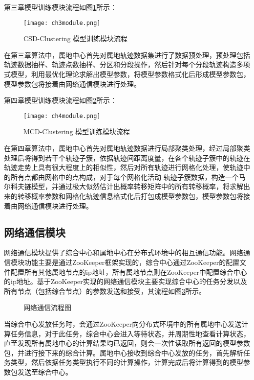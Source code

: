 第三章模型训练模块流程如图\ref{ch3module}所示：
\begin{figure}[h]
	\texttt{[image: ch3module.png]}
	\caption{CSD-Clustering 模型训练模块流程}
	\label{ch3module}
\end{figure}

在第三章算法中，属地中心首先对属地轨迹数据集进行了数据预处理，预处理包括轨迹数据抽样、轨迹点数抽样、分区和分段操作，然后针对每个分段轨迹构造多项式模型，利用最优化理论求解出模型参数，将模型参数格式化后形成模型参数包，模型参数包将接着由网络通信模块进行处理。

第四章模型训练模块流程如图\ref{ch4module}所示：
\begin{figure}[h]
	\texttt{[image: ch4module.png]}
	\caption{MCD-Clustering 模型训练模块流程}
	\label{ch4module}
\end{figure}

在第四章算法中，属地中心首先对属地轨迹数据进行局部聚类处理，经过局部聚类处理后将得到若干个轨迹子簇，依据轨迹间距离度量，在各个轨迹子簇中的轨迹在轨迹走势上具有很大程度上的相似性，然后对所有轨迹进行网格化处理，使轨迹中的所有点都由网格中的点构成，对于每个网格化活动 轨迹子簇数据，构造一个马尔科夫链模型，并通过极大似然估计出概率转移矩阵中的所有转移概率，将求解出来的转移概率参数和网格化轨迹信息格式化后打包成模型参数包，模型参数包将接着由网络通信模块进行处理。

\subsection{网络通信模块}

网络通信模块提供了综合中心和属地中心在分布式环境中的相互通信功能。网络通信模块功能主要是通过ZooKeeper框架实现的，综合中心通过ZooKeeper的配置文件配置所有其他属地节点的ip地址，所有属地节点则在ZooKeeper中配置综合中心的ip地址。基于ZooKeeper实现的网络通信模块主要实现综合中心的任务分发以及所有节点（包括综合节点）的参数发送和接受，其流程如图\ref{comm}所示。
\begin{figure}[h]
\caption{网络通信流程图}
\label{comm}
\end{figure}

当综合中心发放任务时，会通过ZooKeeper向分布式环境中的所有属地中心发送计算任务信息，对于此任务，综合中心会进入等待状态，并周期性地查看计算状态，直至发现所有属地中心的计算结果均已返回，则会一次性读取所有返回的模型参数包，并进行接下来的综合计算。属地中心接收到综合中心发放的任务，首先解析任务类型，然后依据任务类型执行不同的计算操作，计算完成后将计算得到的模型参数包发送至综合中心。

